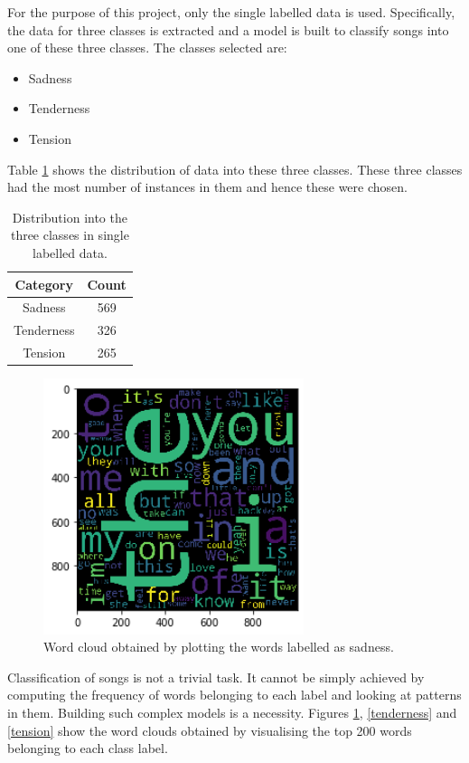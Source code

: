 \documentclass[11pt,a4paper]{article}
\begin{document}
For the purpose of this project, only the single labelled data is used. Specifically, the data for three classes is extracted and a model is built to classify songs into one of these three classes. The classes selected are:
\begin{itemize}
  \item Sadness
  \item Tenderness
  \item Tension
\end{itemize}
Table \ref{distribution} shows the distribution of data into these three classes. These three classes had the most number of instances in them and hence these were chosen.
\begin{table}[!htbp]
  \centering
  \caption{Distribution into the three classes in single labelled data.}
  \label{distribution}
  \begin{tabular}{|c|c|} \hline
  \textbf{Category} & \textbf{Count}\\ \hline
  Sadness & 569\\ \hline
  Tenderness & 326\\ \hline
  Tension & 265\\ \hline
  \end{tabular}
\end{table}

\begin{figure}[!htbp]
  \begin{center}
  \includegraphics[width=3in]{3_sadness.png}
  \caption{Word cloud obtained by plotting the words labelled as sadness.}
  \label{sadness}
  \end{center}
\end{figure}

Classification of songs is not a trivial task. It cannot be simply achieved by computing the frequency of words belonging to each label and looking at patterns in them. Building such complex models is a necessity. Figures \ref{sadness}, \ref{tenderness} and \ref{tension} show the word clouds obtained by visualising the top 200 words belonging to each class label.
\end{document}
